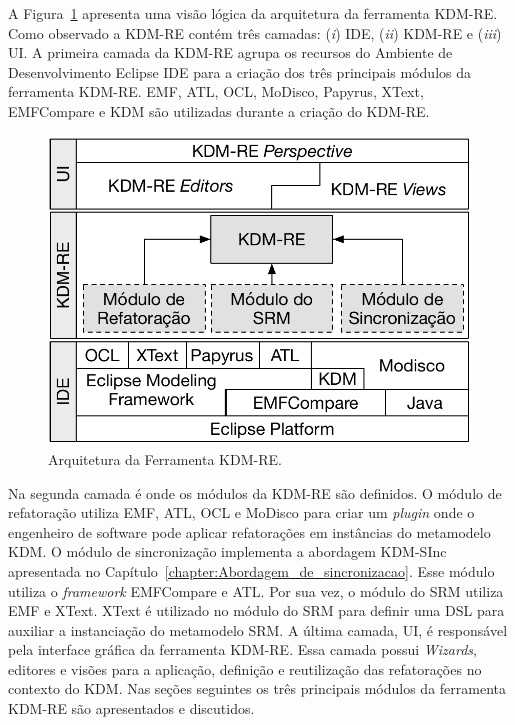 A Figura~\ref{fig:arquitetura_ferramenta_kdm_re} apresenta uma visão lógica da arquitetura da ferramenta KDM-RE. Como observado a KDM-RE contém três camadas: (\textit{i}) IDE, (\textit{ii}) KDM-RE e (\textit{iii}) UI. A primeira camada da KDM-RE agrupa os recursos do Ambiente de Desenvolvimento Eclipse IDE para a criação dos três principais módulos da ferramenta KDM-RE. EMF, ATL, OCL, MoDisco, Papyrus, XText, EMFCompare e KDM são utilizadas durante a criação do KDM-RE.

\begin{figure}[h]
	\centering
	\caption{Arquitetura da Ferramenta KDM-RE.}
	\label{fig:arquitetura_ferramenta_kdm_re}
	\includegraphics[scale=0.75]{images/arquitetura_KDM-RE}
	\fautor
\end{figure}

Na segunda camada é onde os módulos da KDM-RE são definidos. O módulo de refatoração utiliza EMF, ATL, OCL e MoDisco para criar um \textit{plugin} onde o engenheiro de software pode aplicar refatorações em instâncias do metamodelo KDM. O módulo de sincronização implementa a abordagem KDM-SInc apresentada no Capítulo~\ref{chapter:Abordagem_de_sincronizacao}. Esse módulo utiliza o \textit{framework} EMFCompare e ATL. Por sua vez, o módulo do SRM utiliza EMF e XText. XText é utilizado no módulo do SRM para definir uma DSL para auxiliar a instanciação do metamodelo SRM. A última camada, UI, é responsável pela interface gráfica da ferramenta KDM-RE. Essa camada possui \textit{Wizards}, editores e visões para a aplicação, definição e reutilização das refatorações no contexto do KDM. Nas seções seguintes os três principais módulos da ferramenta KDM-RE são apresentados e discutidos.


